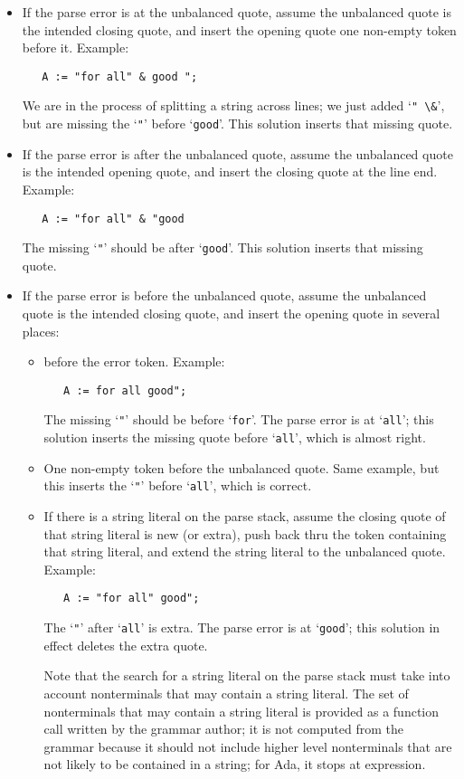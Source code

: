 \documentclass{article}
\newcommand{\code}[1]{`\lstinline|#1|'}
\begin{document}
\begin{itemize}
\item If the parse error is at the unbalanced quote, assume the unbalanced
quote is the intended closing quote, and insert the opening quote one
non-empty token before it. Example:
\begin{lstlisting}
   A := "for all" & good ";
\end{lstlisting}
We are in the process of splitting a string across lines; we just
added \code{" \&}, but are missing the \code{"} before \code{good}.
This solution inserts that missing quote.

\item If the parse error is after the unbalanced quote, assume the unbalanced
quote is the intended opening quote, and insert the closing quote at
the line end. Example:
\begin{lstlisting}
   A := "for all" & "good
\end{lstlisting}
The missing \code{"} should be after \code{good}.
This solution inserts that missing quote.

\item If the parse error is before the unbalanced quote, assume the unbalanced
quote is the intended closing quote, and insert the opening quote in
several places:

\begin{itemize}
\item before the error token. Example:
\begin{lstlisting}
   A := for all good";
\end{lstlisting}
The missing \code{"} should be before \code{for}. The parse error is at \code{all};
this solution inserts the missing quote before \code{all}, which is
almost right.

\item One non-empty token before the unbalanced quote. Same example,
  but this inserts the \code{"} before \code{all}, which is correct.

\item If there is a string literal on the parse stack, assume the
  closing quote of that string literal is new (or extra), push back
  thru the token containing that string literal, and extend the string
  literal to the unbalanced quote.
  Example:
\begin{lstlisting}
   A := "for all" good";
\end{lstlisting}
The \code{"} after \code{all} is extra. The parse error is at \code{good};
this solution in effect deletes the extra quote.

Note that the search for a string literal on the parse stack must take
into account nonterminals that may contain a string literal. The set
of nonterminals that may contain a string literal is provided as a
function call written by the grammar author; it is not computed from
the grammar because it should not include higher level nonterminals
that are not likely to be contained in a string; for Ada, it stops at
expression.
\end{itemize}
\end{itemize}
\end{document}
